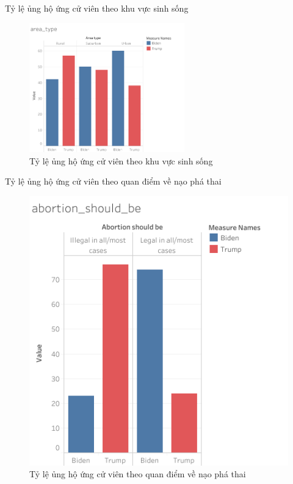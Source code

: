 \documentclass[10pt]{beamer}
\theoremstyle{remark}
\theoremstyle{definition}
\begin{document}
\begin{frame}{Tỷ lệ ủng hộ ứng cử viên theo khu vực sinh sống}
	\begin{figure}[h!]
        \centering
        \includegraphics[width=0.6\textwidth]{figures/area_type.png}
        \caption{Tỷ lệ ủng hộ ứng cử viên theo khu vực sinh sống}
    \end{figure}
\end{frame}

\begin{frame}{Tỷ lệ ủng hộ ứng cử viên theo quan điểm về nạo phá thai}
	\begin{figure}[h!]
        \centering
        \includegraphics[height=0.7\textheight]{figures/abortion_should_be.png}
        \caption{Tỷ lệ ủng hộ ứng cử viên theo quan điểm về nạo phá thai}
    \end{figure}
\end{frame}
\end{document}
